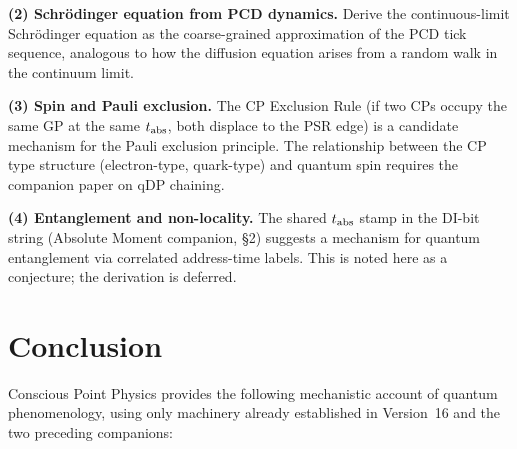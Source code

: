 \documentclass[12pt]{article}
\begin{document}
\textbf{(2) Schr\"odinger equation from PCD dynamics.}  Derive the
continuous-limit Schr\"odinger equation as the coarse-grained approximation
of the PCD tick sequence, analogous to how the diffusion equation arises from
a random walk in the continuum limit.

\textbf{(3) Spin and Pauli exclusion.}  The CP Exclusion Rule (if two CPs
occupy the same GP at the same $t_{\rm abs}$, both displace to the PSR edge)
is a candidate mechanism for the Pauli exclusion principle.  The relationship
between the CP type structure (electron-type, quark-type) and quantum spin
requires the companion paper on qDP chaining.

\textbf{(4) Entanglement and non-locality.}  The shared $t_{\rm abs}$ stamp
in the DI-bit string (Absolute Moment companion, \S 2) suggests a mechanism
for quantum entanglement via correlated address-time labels.  This is noted
here as a conjecture; the derivation is deferred.

\section{Conclusion}
\label{sec:conclusion}

Conscious Point Physics provides the following mechanistic account of quantum
phenomenology, using only machinery already established in Version~16 and the
two preceding companions:
\end{document}

